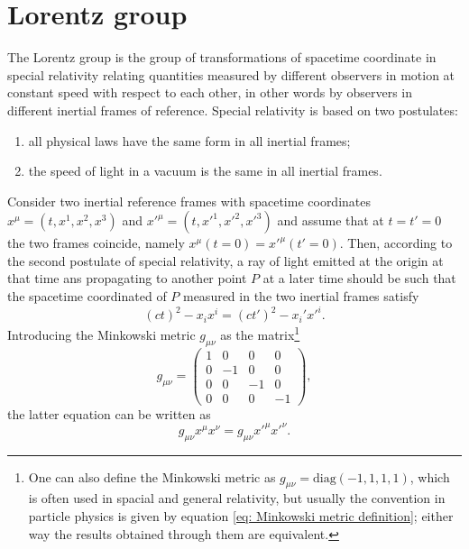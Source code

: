 \section{Lorentz group}
The Lorentz group is the group of transformations of spacetime coordinate in special relativity relating quantities measured by different observers in motion at constant speed with respect to each other, in other words by observers in different inertial frames of reference. Special relativity is based on two postulates:
\begin{enumerate}
    \item all physical laws have the same form in all inertial frames;
    \item the speed of light in a vacuum is the same in all inertial frames.
\end{enumerate}
Consider two inertial reference frames with spacetime coordinates $x^\mu = (t,x^1,x^2,x^3)$ and $x'^\mu = (t,x'^1,x'^2,x'^3)$ and assume that at $t = t' = 0$ the two frames coincide, namely $x^\mu(t = 0) = x'^\mu(t' = 0)$. Then, according to the second postulate of special relativity, a ray of light emitted at the origin at that time ans propagating to another point $P$ at a later time should be such that the spacetime coordinated of $P$ measured in the two inertial frames satisfy
\begin{equation}
    (ct)^2 - x_ix^i = (ct')^2 - x_i'x'^i.
\end{equation}
Introducing the Minkowski metric $g_{\mu\nu}$ as the matrix\footnote{One can also define the Minkowski metric as $g_{\mu\nu} = \mathrm{diag}(-1,1,1,1)$, which is often used in spacial and general relativity, but usually the convention in particle physics is given by equation \eqref{eq: Minkowski metric definition}; either way the results obtained through them are equivalent.}
\begin{equation}
\label{eq: Minkowski metric definition}
    g_{\mu\nu} = 
    \begin{pmatrix}
        1 & 0 & 0 & 0 \\
        0 & - 1 & 0 & 0 \\
        0 & 0 & -1 & 0 \\
        0 & 0 & 0 & -1
    \end{pmatrix},
\end{equation}
the latter equation can be written as
\begin{equation}
\label{eq: invariance of relativistic interval}
    g_{\mu\nu}x^\mu x^\nu = g_{\mu\nu}x'^\mu x'^\nu.
\end{equation}
